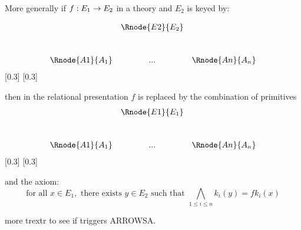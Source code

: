 \documentclass[12pt,a4paper]{article}
\begin{document}
\noindent More generally if $f: E_1 \rightarrow E_2$ in a theory
and $E_2$ is keyed by:
\begin{samepage}
\begin{equation}
\begin{array}{c c c} 
               &\Rnode{E2}{E_2} &                 \\ [1.0cm]
\Rnode{A1}{A_1}&  ...           &\Rnode{An}{A_n}
\end{array}  
\end{equation}
[0.3]
[0.3]
\\
\end{samepage}
\begin{samepage}
\noindent then in the relational presentation $f$ is replaced by the combination of primitives
\begin{equation}
\begin{array}{c c c} 
               &\Rnode{E1}{E_1} &                 \\ [1.0cm]
\Rnode{A1}{A_1}&  ...           &\Rnode{An}{A_n}
\end{array}  
\end{equation}
[0.3]
[0.3]
\\
\end{samepage}
and the axiom: 
$$
\mbox{for all }x \in E_1,\mbox{ there exists }y \in E_2\mbox{ such that } \bigwedge_{1 \leq i \leq n} k_i(y) = fk_i(x)
$$

\noindent more trextr to see 
if triggers ARROWSA.
\end{document}
